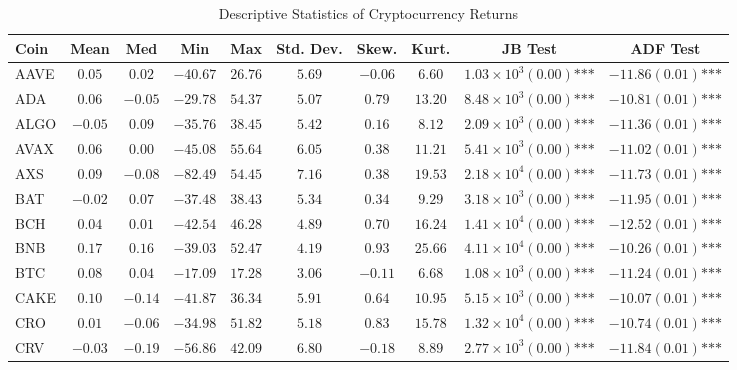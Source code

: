 \documentclass{article}
\begin{document}
\begin{table}[htbp]
\centering
\caption{Descriptive Statistics of Cryptocurrency Returns}
\label{tab:coin_descriptive}
\begin{adjustbox}{width=\textwidth}
\begin{tabular}{lccccccccc}
\toprule
Coin & Mean & Med & Min & Max & Std. Dev. & Skew. & Kurt. & JB Test & ADF Test \\
\midrule
AAVE & $0.05$ & $0.02$ & $-40.67$ & $26.76$ & $5.69$ & $-0.06$ & $6.60$ & $1.03\times 10^{3}(0.00)\text{***}$ & $-11.86(0.01)\text{***}$ \\
ADA & $0.06$ & $-0.05$ & $-29.78$ & $54.37$ & $5.07$ & $0.79$ & $13.20$ & $8.48\times 10^{3}(0.00)\text{***}$ & $-10.81(0.01)\text{***}$ \\
ALGO & $-0.05$ & $0.09$ & $-35.76$ & $38.45$ & $5.42$ & $0.16$ & $8.12$ & $2.09\times 10^{3}(0.00)\text{***}$ & $-11.36(0.01)\text{***}$ \\
AVAX & $0.06$ & $0.00$ & $-45.08$ & $55.64$ & $6.05$ & $0.38$ & $11.21$ & $5.41\times 10^{3}(0.00)\text{***}$ & $-11.02(0.01)\text{***}$ \\
AXS & $0.09$ & $-0.08$ & $-82.49$ & $54.45$ & $7.16$ & $0.38$ & $19.53$ & $2.18\times 10^{4}(0.00)\text{***}$ & $-11.73(0.01)\text{***}$ \\
BAT & $-0.02$ & $0.07$ & $-37.48$ & $38.43$ & $5.34$ & $0.34$ & $9.29$ & $3.18\times 10^{3}(0.00)\text{***}$ & $-11.95(0.01)\text{***}$ \\
BCH & $0.04$ & $0.01$ & $-42.54$ & $46.28$ & $4.89$ & $0.70$ & $16.24$ & $1.41\times 10^{4}(0.00)\text{***}$ & $-12.52(0.01)\text{***}$ \\
BNB & $0.17$ & $0.16$ & $-39.03$ & $52.47$ & $4.19$ & $0.93$ & $25.66$ & $4.11\times 10^{4}(0.00)\text{***}$ & $-10.26(0.01)\text{***}$ \\
BTC & $0.08$ & $0.04$ & $-17.09$ & $17.28$ & $3.06$ & $-0.11$ & $6.68$ & $1.08\times 10^{3}(0.00)\text{***}$ & $-11.24(0.01)\text{***}$ \\
CAKE & $0.10$ & $-0.14$ & $-41.87$ & $36.34$ & $5.91$ & $0.64$ & $10.95$ & $5.15\times 10^{3}(0.00)\text{***}$ & $-10.07(0.01)\text{***}$ \\
CRO & $0.01$ & $-0.06$ & $-34.98$ & $51.82$ & $5.18$ & $0.83$ & $15.78$ & $1.32\times 10^{4}(0.00)\text{***}$ & $-10.74(0.01)\text{***}$ \\
CRV & $-0.03$ & $-0.19$ & $-56.86$ & $42.09$ & $6.80$ & $-0.18$ & $8.89$ & $2.77\times 10^{3}(0.00)\text{***}$ & $-11.84(0.01)\text{***}$ \\

\end{tabular}
\end{adjustbox}
\end{table}
\end{document}
